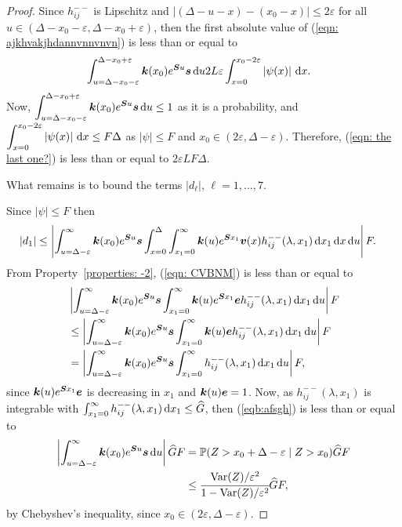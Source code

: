 \begin{proof}
	Since \(h_{ij}^{--}\) is Lipschitz and \(|(\Delta-u-x)-(x_0-x)|\leq 2\varepsilon\) for all \(u\in(\Delta-x_0-\varepsilon,\Delta-x_0+\varepsilon)\), then the first absolute value of (\ref{eqn: ajkhvakjhdannvnnvnvn}) is less than or equal to 
	\begin{align}
		&\int_{u=\Delta-x_0-\varepsilon}^{\Delta-x_0+\varepsilon} \boldsymbol k(x_0)e^{\boldsymbol Su}\boldsymbol s \, \mathrm{d} u 2L\varepsilon \int_{x=0}^{x_0-2\varepsilon} \left|\psi(x)\right|\, \mathrm{d} x. \label{eqn: the last one?}
	\end{align}
	Now, \(\displaystyle \int_{u=\Delta-x_0-\varepsilon}^{\Delta-x_0+\varepsilon} \boldsymbol k(x_0)e^{\boldsymbol Su}\boldsymbol s \, \mathrm{d} u\leq 1\) as it is a probability, and \(\displaystyle \int_{x=0}^{x_0-2\varepsilon} \left|\psi(x)\right|\, \mathrm{d} x \leq F\Delta\) as \(|\psi|\leq F\) and \(x_0\in(2\varepsilon,\Delta-\varepsilon)\). Therefore, (\ref{eqn: the last one?}) is less than or equal to \(2\varepsilon LF\Delta.\)

	What remains is to bound the terms \(|d_\ell|,\, \ell=1,\dots,7\). 
	
	Since \(|\psi|\leq F\) then 
	\begin{align}
		|d_1|&\leq \left|\int_{u=\Delta-\varepsilon}^\infty \boldsymbol k(x_0)e^{\boldsymbol Su}\boldsymbol s \int_{x=0}^{\Delta}  \int_{x_1=0}^\infty \boldsymbol k(u)  e^{\boldsymbol S x_1} {\boldsymbol v}(x) h_{ij}^{--}(\lambda, x_1)  \, \mathrm{d} x_1 \, \mathrm{d} x \, \mathrm{d} u\right|F.\label{eqn:  CVBNM}
	\end{align}
	From Property~\ref{properties: -2}, (\ref{eqn:  CVBNM}) is less than or equal to 
	\begin{align}
		\nonumber &\left|\int_{u=\Delta-\varepsilon}^\infty \boldsymbol k(x_0)e^{\boldsymbol Su}\boldsymbol s  \int_{x_1=0}^\infty \boldsymbol k(u)  e^{\boldsymbol S x_1} {\boldsymbol e} h_{ij}^{--}(\lambda, x_1) \, \mathrm{d} x_1 \, \mathrm{d} u\right|F
		\\\nonumber &\leq\left|\int_{u=\Delta-\varepsilon}^\infty \boldsymbol k(x_0)e^{\boldsymbol Su}\boldsymbol s  \int_{x_1=0}^\infty \boldsymbol k(u) {\boldsymbol e} h_{ij}^{--}(\lambda, x_1) \, \mathrm{d} x_1 \, \mathrm{d} u\right|F
		\\&=\left|\int_{u=\Delta-\varepsilon}^\infty \boldsymbol k(x_0)e^{\boldsymbol Su}\boldsymbol s  \int_{x_1=0}^\infty h_{ij}^{--}(\lambda, x_1) \, \mathrm{d} x_1 \, \mathrm{d} u\right|F, \label{eqb:afsgh}
	\end{align}
	since \(\boldsymbol k(u)e^{\boldsymbol Sx_1}\boldsymbol e\) is decreasing in \(x_1\) and \(\boldsymbol k(u)\boldsymbol e=1\). Now, as \(h_{ij}^{--}(\lambda,x_1)\) is integrable with \(\int_{x_1=0}^\infty h_{ij}^{--}(\lambda, x_1)\, \mathrm{d} x_1\leq \widehat{ G}\), then (\ref{eqb:afsgh}) is less than or equal to
	\begin{align}
		\nonumber \left|\int_{u=\Delta-\varepsilon}^\infty \boldsymbol k(x_0)e^{\boldsymbol Su}\boldsymbol s \, \mathrm{d} u\right|\widehat GF
		&=\mathbb P(Z>x_0+\Delta-\varepsilon\mid Z>x_0)\widehat G F
		\\&\leq\cfrac{\mathrm{Var}{(Z)}/\varepsilon^2}{1-\mathrm{Var}{(Z)}/\varepsilon^2} \widehat G F,\nonumber 
	\end{align}
	by Chebyshev's inequality, since \(x_0\in(2\varepsilon,\Delta-\varepsilon)\). 


\end{proof}
